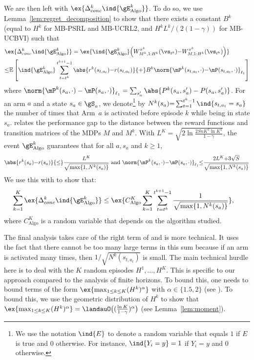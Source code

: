 \begin{subappendices}
We are then left with $\ex{\Delta_{conc}^k \ind{\gE^{k}_\text{Algo}}}$. To do so, we use Lemma~\ref{lem:regret_decomposition} to show that there exists a constant $B^k$ (equal to $H^k$ for MB-PSRL and MB-UCRL2, and $H^kL^{k}/(2(1-\gamma))$ for MB-UCBVI) such that 
\begin{align}
    &\ex{\Delta_{conc}^k\ind{\gE^{k}_\text{Algo}}}=\ex{\ind{\gE^{k}_\text{Algo}} \Big(W_{M^k,1:H^k}^{\pi^k}(\vs_{t^k}){-}W_{M,1:H^k}^{\pi^k}(\vs_{t^k})\Big)} \nonumber\\
    & {\le} \mathbb{E}\left[\ind{\gE^{k}_\text{Algo}} \sum_{t=t^k}^{t^{k+1}{-}1}\abs{r^k(s_{t,a_t}){-}r(s_{t,a_t})}{+}B^k\norm{\mP^{k}(s_{t,a_t},\cdot){-}\mP(s_{t,a_t},\cdot)}_{\ell_1}\right] \label{eq:proof2}
\end{align}
where ${\norm{\mP^{k}(s_a,\cdot)-\mP(s_a,\cdot)}_{\ell_1}=\sum_{s'_a}\abs{P^{k}(s_a,s'_a)-P(s_a,s'_a)}}$. 
For an arm $a$ and a state $s_a\in\gS_a$, we denote\footnote{We use the notation $\ind{E}$ to denote a random variable that equals $1$ if $E$ is true and $0$ otherwise. For instance, $\ind{Y_i=y}=1$ if $Y_i=y$ and $0$ otherwise.} by $N^{k}(s_a){=} \sum_{t=1}^{t^{k}-1} \ind{s_{t,a_t}=s_a}$ the number of times that Arm~$a$ is activated before episode $k$ while being in state $s_a$.  relates the performance gap to the distance between the reward functions and transition matrices of the MDPs $M$ and $M^k$. 
With $L^K{=}\sqrt{2\ln\frac{2SnK^2\ln K^2}{1-\gamma}}$, the event $\gE^{k}_\text{Algo}$ guarantees that for all $a, s_a$ and $ k\ge1$, 
\begin{align}
    \label{eq:concentration}
    \abs{r^k(s_a){-}r(s_a)} {\le} \frac{L^K}{\sqrt{\max\{1,N^{k}(s_a)\}}} \text{ and }
    \norm{\mP^{k}(s_a,\cdot){-}\mP(s_a,\cdot)}_{\ell_1} {\le} \frac{2L^K {+}3\sqrt{S}}{\sqrt{\max\{1,N^{k}(s_a)\}}}
\end{align}
We use this with  to show that:
\begin{align}
    \label{eq:proof3}
    \sum_{k=1}^K\ex{\Delta_{conc}^k \ind{\gE_\text{Algo}^{k}}} &\le  \ex{C_\text{Algo}^K\sum_{k=1}^K\sum_{t=t^k}^{t^{k+1}-1}\frac{1}{\sqrt{\max\{1,N^{k}(s_a)\}}}},
\end{align}
where $C_\text{Algo}^K$ is a random variable that depends on the algorithm studied. 

The final analysis takes care of the right term of  and is more technical. It uses the fact that there cannot be too many large terms in this sum because if an arm is activated many times, then $1/\sqrt{N^{k}(s_{t,a_t})}$ is small. 
The main technical hurdle here is to deal with the $K$ random episodes $H^1,\ldots, H^K$. 
This is specific to our approach compared to the analysis of finite horizons. 
To bound this, one needs to bound terms of the form $\ex{\max_{1\leq k\leq K} (H^k)^\alpha}$ with $\alpha\in\{1.5,2\}$ (see ). 
To bound this, we use the geometric distribution of $H^k$ to show that $\ex{\max_{1\leq k\leq K} (H^k)^{\alpha}}=\landauO\bigl((\frac{\ln K}{1-\gamma})^{\alpha}\bigr)$ (see Lemma~\ref{lem:moment}).


\end{subappendices}
